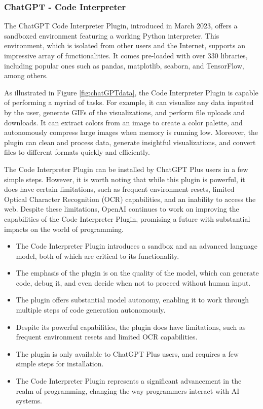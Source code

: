 \subsubsection{ChatGPT - Code Interpreter}
The ChatGPT Code Interpreter Plugin, introduced in March 2023, offers a sandboxed environment featuring a working Python interpreter. This environment, which is isolated from other users and the Internet, supports an impressive array of functionalities. It comes pre-loaded with over 330 libraries, including popular ones such as pandas, matplotlib, seaborn, and TensorFlow, among others.

As illustrated in Figure \ref{fig:chatGPTdata}, the Code Interpreter Plugin is capable of performing a myriad of tasks. For example, it can visualize any data inputted by the user, generate GIFs of the visualizations, and perform file uploads and downloads. It can extract colors from an image to create a color palette, and autonomously compress large images when memory is running low. Moreover, the plugin can clean and process data, generate insightful visualizations, and convert files to different formats quickly and efficiently.

The Code Interpreter Plugin can be installed by ChatGPT Plus users in a few simple steps. However, it is worth noting that while this plugin is powerful, it does have certain limitations, such as frequent environment resets, limited Optical Character Recognition (OCR) capabilities, and an inability to access the web. Despite these limitations, OpenAI continues to work on improving the capabilities of the Code Interpreter Plugin, promising a future with substantial impacts on the world of programming.

\begin{itemize}
\item The Code Interpreter Plugin introduces a sandbox and an advanced language model, both of which are critical to its functionality.
\item The emphasis of the plugin is on the quality of the model, which can generate code, debug it, and even decide when not to proceed without human input.
\item The plugin offers substantial model autonomy, enabling it to work through multiple steps of code generation autonomously.
\item Despite its powerful capabilities, the plugin does have limitations, such as frequent environment resets and limited OCR capabilities.
\item The plugin is only available to ChatGPT Plus users, and requires a few simple steps for installation.
\item The Code Interpreter Plugin represents a significant advancement in the realm of programming, changing the way programmers interact with AI systems.
\end{itemize}

